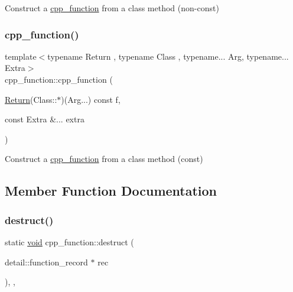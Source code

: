 Construct a \mbox{\hyperlink{classcpp__function}{cpp\+\_\+function}} from a class method (non-\/const) 

\mbox{\label{classcpp__function_adf1a5ad6ed0992a0bd07c2048b98d6f1}} 
\subsubsection{\texorpdfstring{cpp\_function()}{cpp\_function()}\hspace{0.1cm}{\footnotesize\ttfamily [6/6]}}
{\footnotesize\ttfamily template$<$typename Return , typename Class , typename... Arg, typename... Extra$>$ \\
cpp\+\_\+function\+::cpp\+\_\+function (\begin{DoxyParamCaption}\item[{\mbox{\hyperlink{_python-ast_8h_abdae7f49d66ce8e500825bb53aa14901}{Return}}(Class\+::$\ast$)(Arg...) const}]{f,  }\item[{const Extra \&...}]{extra }\end{DoxyParamCaption})\hspace{0.3cm}{\ttfamily [inline]}}



Construct a \mbox{\hyperlink{classcpp__function}{cpp\+\_\+function}} from a class method (const) 



\subsection{Member Function Documentation}
\mbox{\label{classcpp__function_a61bdafab94b0fa0bad23c5161e7f9e59}} 
\subsubsection{\texorpdfstring{destruct()}{destruct()}}
{\footnotesize\ttfamily static \mbox{\hyperlink{_s_d_l__opengles2__gl2ext_8h_ae5d8fa23ad07c48bb609509eae494c95}{void}} cpp\+\_\+function\+::destruct (\begin{DoxyParamCaption}\item[{detail\+::function\+\_\+record $\ast$}]{rec }\end{DoxyParamCaption})\hspace{0.3cm}{\ttfamily [inline]}, {\ttfamily [static]}, {\ttfamily [protected]}}



